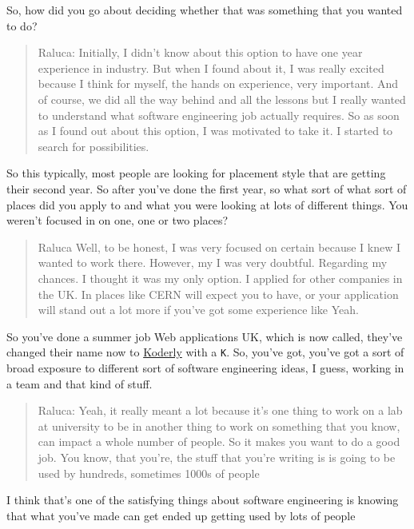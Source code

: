 \documentclass[
]{book}
\begin{document}
So, how did you go about deciding whether that was something that you wanted to do?

\begin{quote}
Raluca: Initially, I didn't know about this option to have one year experience in industry. But when I found about it, I was really excited because I think for myself, the hands on experience, very important. And of course, we did all the way behind and all the lessons but I really wanted to understand what software engineering job actually requires. So as soon as I found out about this option, I was motivated to take it. I started to search for possibilities.
\end{quote}

So this typically, most people are looking for placement style that are getting their second year. So after you've done the first year, so what sort of what sort of places did you apply to and what you were looking at lots of different things. You weren't focused in on one, one or two places?

\begin{quote}
Raluca Well, to be honest, I was very focused on certain because I knew I wanted to work there. However, my I was very doubtful. Regarding my chances. I thought it was my only option. I applied for other companies in the UK. In places like CERN will expect you to have, or your application will stand out a lot more if you've got some experience like Yeah.
\end{quote}

So you've done a summer job Web applications UK, which is now called, they've changed their name now to \href{https://www.koder.ly/}{Koderly} with a \texttt{K}. So, you've got, you've got a sort of broad exposure to different sort of software engineering ideas, I guess, working in a team and that kind of stuff.

\begin{quote}
Raluca: Yeah, it really meant a lot because it's one thing to work on a lab at university to be in another thing to work on something that you know, can impact a whole number of people. So it makes you want to do a good job. You know, that you're, the stuff that you're writing is is going to be used by hundreds, sometimes 1000s of people
\end{quote}

I think that's one of the satisfying things about software engineering is knowing that what you've made can get ended up getting used by lots of people
\end{document}
